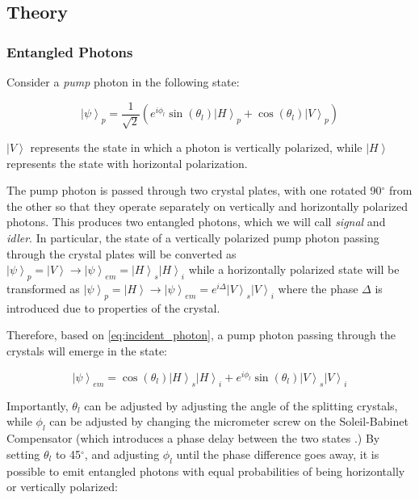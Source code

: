 \documentclass[letter,scriptaddress,twocolumn, prl, nofootinbib]{revtex4}
\newcommand{\ket}[1]{\left| #1 \right\rangle}
\begin{document}
\subsection{Theory}
\label{subsec:theory}

\subsubsection{Entangled Photons}
Consider a \textit{pump} photon in the following state:

\begin{equation}
\ket{\psi}_p = \frac{1}{\sqrt{2}} \left( e^{i \phi_l}\sin(\theta_l)\ket{H}_p + \cos(\theta_l) \ket{V}_p\right)
\label{eq:incident_photon}
\end{equation}

$\ket{V}$ represents the state in which a photon is vertically polarized, while $\ket{H}$ represents the state with horizontal polarization. 

The pump photon is passed through two crystal plates, with one rotated 90$^\circ$ from the other so that they operate separately on vertically and horizontally polarized photons. This produces two entangled photons, which we will call \textit{signal} and \textit{idler}. In particular, the state of a vertically polarized pump photon passing through the crystal plates will be converted as $\ket{\psi}_p = \ket{V} \rightarrow \ket{\psi}_{em} = \ket{H}_s\ket{H}_i$ while a horizontally polarized state will be transformed as $\ket{\psi}_p = \ket{H} \rightarrow \ket{\psi}_{em} = e^{i \Delta} \ket{V}_s \ket{V}_i$ where the phase $\Delta$ is introduced due to properties of the crystal.

Therefore, based on \autoref{eq:incident_photon}, a pump photon passing through the crystals will emerge in the state\cite{dehlinger_entangled_2002-1}:

\begin{equation}\label{eq:entangledstate}
    \ket{\psi}_{em} = \cos(\theta_l)\ket{H}_s\ket{H}_i + e^{i \phi_l}\sin(\theta_l)\ket{V}_s\ket{V}_i
\end{equation}

Importantly, $\theta_l$ can be adjusted by adjusting the angle of the splitting crystals, while $\phi_l$ can be adjusted by changing the micrometer screw on the Soleil-Babinet Compensator (which introduces a phase delay between the two states \cite{moyer_bells_2014}.) By setting $\theta_l$ to 45$^\circ$, and adjusting $\phi_l$ until the phase difference goes away, it is possible to emit entangled photons with equal probabilities of being horizontally or vertically polarized:
\end{document}
